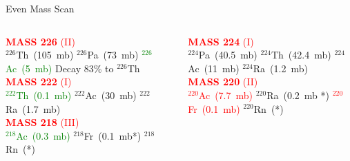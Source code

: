 \documentclass[10pt]{beamer}
\begin{document}
\begin{frame}{Even Mass Scan}	
	\begin{columns}
		\begin{column}{0.5\textwidth}
			\begin{overlayarea}{\textwidth}{0.5\textheight}
				\centering
				\textcolor{red}{\textbf{MASS 226} (II)}\\
				{\footnotesize $^{226}$Th~(105~mb) $^{226}$Pa~(73~mb) \textcolor{green}{$^{226}$Ac~(5~mb)} Decay 83\% to $^{226}$Th}\\
				\vspace{0.05\textheight}
				\textcolor{red}{\textbf{MASS 222} (I)}\\
				{\footnotesize\textcolor{green}{$^{222}$Th~(0.1~mb)} $^{222}$Ac~(30~mb) $^{222}$Ra~(1.7~mb) }\\
				\vspace{0.05\textheight}
				\textcolor{red}{\textbf{MASS 218} (III)}\\
				{\footnotesize\textcolor{green}{$^{218}$Ac~(0.3~mb)} $^{218}$Fr~(0.1~mb*) $^{218}$Rn~(*) }
			\end{overlayarea}
		\end{column}
		\begin{column}{0.5\textwidth}
			\begin{overlayarea}{\textwidth}{0.5\textheight}
				\centering
				\textcolor{red}{\textbf{MASS 224} (I)}\\
				{\footnotesize $^{224}$Pa~(40.5~mb) $^{224}$Th~(42.4~mb) $^{224}$Ac~(11~mb) $^{224}$Ra~(1.2~mb)}\\
				\vspace{0.05\textheight}
				\textcolor{red}{\textbf{MASS 220} (II)}\\
				{\footnotesize\textcolor{red}{$^{220}$Ac~(7.7~mb)} $^{220}$Ra~(0.2~mb *) \textcolor{red}{$^{220}$Fr~(0.1~mb)} $^{220}$Rn~(*)}\\
			\end{overlayarea}
		\end{column}
	\end{columns}	
\end{frame}
\end{document}
